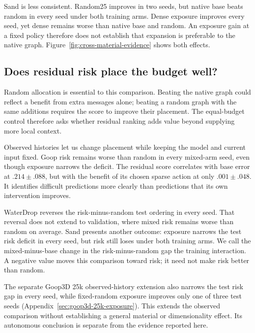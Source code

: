 Sand is less consistent. Random25 improves in two seeds, but native base beats random in every seed under both training arms. Dense exposure improves every seed, yet dense remains worse than native base and random. An exposure gain at a fixed policy therefore does not establish that expansion is preferable to the native graph. Figure~\ref{fig:cross-material-evidence} shows both effects.

\subsection{Does residual risk place the budget well?}
Random allocation is essential to this comparison. Beating the native graph could reflect a benefit from extra messages alone; beating a random graph with the same additions requires the score to improve their placement. The equal-budget control therefore asks whether residual ranking adds value beyond supplying more local context.

Observed histories let us change placement while keeping the model and current input fixed. Goop risk remains worse than random in every mixed-arm seed, even though exposure narrows the deficit. The residual score correlates with base error at $.214\pm.088$, but with the benefit of its chosen sparse action at only $.001\pm.048$. It identifies difficult predictions more clearly than predictions that its own intervention improves.

WaterDrop reverses the risk-minus-random test ordering in every seed. That reversal does not extend to validation, where mixed risk remains worse than random on average. Sand presents another outcome: exposure narrows the test risk deficit in every seed, but risk still loses under both training arms. We call the mixed-minus-base change in the risk-minus-random gap the training interaction. A negative value moves this comparison toward risk; it need not make risk better than random.

The separate Goop3D 25k observed-history extension also narrows the test risk gap in every seed, while fixed-random exposure improves only one of three test seeds (Appendix~\ref{sec:goop3d-25k-exposure}). This extends the observed comparison without establishing a general material or dimensionality effect. Its autonomous conclusion is separate from the evidence reported here.


